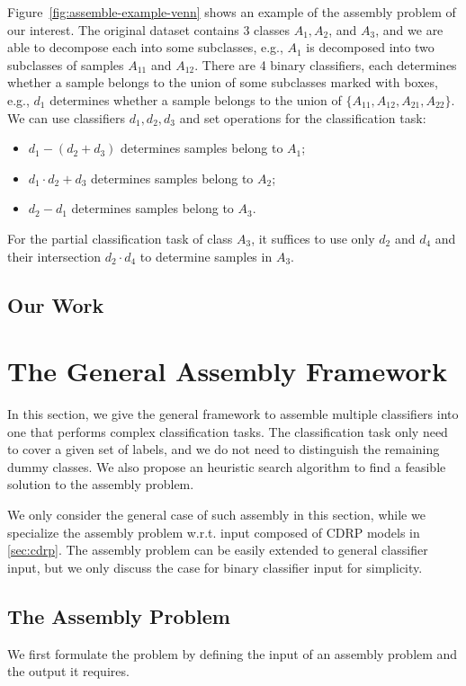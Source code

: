 \documentclass[sigplan,10pt,review]{acmart}\settopmatter{printfolios=true,printccs=false,printacmref=false}
\begin{document}
Figure~\ref{fig:assemble-example-venn} shows an example of the assembly problem of our interest.
The original dataset contains 3 classes $A_1, A_2$, and $A_3$, and we are able to decompose each into some subclasses, e.g., $A_1$ is decomposed into two subclasses of samples $A_{11}$ and $A_{12}$.
There are 4 binary classifiers, each determines whether a sample belongs to the union of some subclasses marked with boxes, e.g., $d_1$ determines whether a sample belongs to the union of $\{A_{11}, A_{12}, A_{21}, A_{22}\}$.
We can use classifiers $d_1, d_2, d_3$ and set operations for the classification task:
\begin{itemize}
	\item $d_1 - (d_2 + d_3)$ determines samples belong to $A_1$;
	\item $d_1 \cdot d_2 + d_3$ determines samples belong to $A_2$;
	\item $d_2 - d_1$ determines samples belong to $A_3$.
\end{itemize}
For the partial classification task of class $A_3$, it suffices to use only $d_2$ and $d_4$ and their intersection $d_2 \cdot d_4$ to determine samples in $A_3$.

\subsection{Our Work}

\section{The General Assembly Framework}
\label{sec:assembly}
In this section, we give the general framework to assemble multiple classifiers into one that performs complex classification tasks.
The classification task only need to cover a given set of labels, and we do not need to distinguish the remaining dummy classes.
We also propose an heuristic search algorithm to find a feasible solution to the assembly problem.

We only consider the general case of such assembly in this section, while we specialize the assembly problem w.r.t. input composed of CDRP models in \cref{sec:cdrp}.
The assembly problem can be easily extended to general classifier input, but we only discuss the case for binary classifier input for simplicity.

\subsection{The Assembly Problem}
\label{sec:assemble-problem}
We first formulate the problem by defining the input of an assembly problem and the output it requires.
\end{document}
